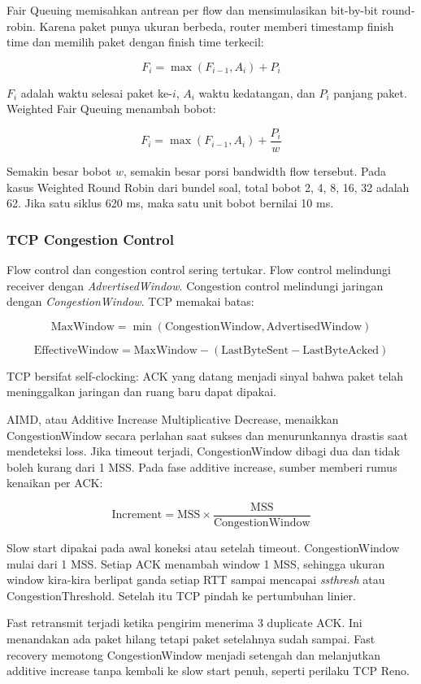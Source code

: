 Fair Queuing memisahkan antrean per flow dan mensimulasikan bit-by-bit round-robin. Karena paket punya ukuran berbeda, router memberi timestamp finish time dan memilih paket dengan finish time terkecil:

\[
F_i=\max(F_{i-1}, A_i)+P_i
\]

$F_i$ adalah waktu selesai paket ke-$i$, $A_i$ waktu kedatangan, dan $P_i$ panjang paket. Weighted Fair Queuing menambah bobot:

\[
F_i=\max(F_{i-1}, A_i)+\frac{P_i}{w}
\]

Semakin besar bobot $w$, semakin besar porsi bandwidth flow tersebut. Pada kasus Weighted Round Robin dari bundel soal, total bobot 2, 4, 8, 16, 32 adalah 62. Jika satu siklus 620 ms, maka satu unit bobot bernilai 10 ms.

\subsubsection*{TCP Congestion Control}

Flow control dan congestion control sering tertukar. Flow control melindungi receiver dengan \textit{AdvertisedWindow}. Congestion control melindungi jaringan dengan \textit{CongestionWindow}. TCP memakai batas:

\[
\text{MaxWindow}=\min(\text{CongestionWindow},\text{AdvertisedWindow})
\]

\[
\text{EffectiveWindow}=\text{MaxWindow}-(\text{LastByteSent}-\text{LastByteAcked})
\]

TCP bersifat self-clocking: ACK yang datang menjadi sinyal bahwa paket telah meninggalkan jaringan dan ruang baru dapat dipakai.

AIMD, atau Additive Increase Multiplicative Decrease, menaikkan CongestionWindow secara perlahan saat sukses dan menurunkannya drastis saat mendeteksi loss. Jika timeout terjadi, CongestionWindow dibagi dua dan tidak boleh kurang dari 1 MSS. Pada fase additive increase, sumber memberi rumus kenaikan per ACK:

\[
\text{Increment}=\text{MSS}\times \frac{\text{MSS}}{\text{CongestionWindow}}
\]

Slow start dipakai pada awal koneksi atau setelah timeout. CongestionWindow mulai dari 1 MSS. Setiap ACK menambah window 1 MSS, sehingga ukuran window kira-kira berlipat ganda setiap RTT sampai mencapai \textit{ssthresh} atau CongestionThreshold. Setelah itu TCP pindah ke pertumbuhan linier.

Fast retransmit terjadi ketika pengirim menerima 3 duplicate ACK. Ini menandakan ada paket hilang tetapi paket setelahnya sudah sampai. Fast recovery memotong CongestionWindow menjadi setengah dan melanjutkan additive increase tanpa kembali ke slow start penuh, seperti perilaku TCP Reno.

